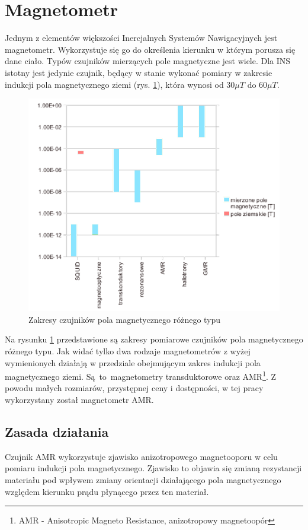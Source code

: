 \section{Magnetometr}
\label{sec:mag}

Jednym z elementów większości Inercjalnych Systemów Nawigacyjnych jest
magnetometr. Wykorzystuje się go do określenia kierunku w którym porusza się dane
ciało. Typów czujników mierzących pole magnetyczne jest wiele. Dla INS istotny
jest jedynie czujnik, będący w stanie wykonać pomiary w zakresie indukcji pola
magnetycznego ziemi (rys. \ref{fig:WykresMagnet}), która wynosi od $30\mu T$ do
$60\mu T$. 

\begin{figure}[!ht]
 \centering
 \includegraphics[width=\textwidth]{../images/ch04/magnetic_sens_types.png}
 \caption{Zakresy czujników pola magnetycznego różnego typu \cite{WstepnyProjektModuluIMU}}
 \label{fig:WykresMagnet}
\end{figure}

Na rysunku \ref{fig:WykresMagnet} przedstawione są zakresy pomiarowe czujników
pola magnetycznego różnego typu. Jak widać tylko dwa rodzaje magnetometrów z
wyżej wymienionych działają w przedziale obejmującym zakres indukcji pola
magnetycznego ziemi. Są~to~magnetometry transduktorowe oraz AMR\footnote{AMR -
Anisotropic Magneto Resistance, anizotropowy magnetoopór}. Z powodu małych
rozmiarów, przystępnej ceny i dostępności, w tej pracy wykorzystany został
magnetometr AMR.

\subsection{Zasada działania}
Czujnik AMR wykorzystuje zjawisko anizotropowego magnetooporu w celu pomiaru
indukcji pola magnetycznego. Zjawisko to objawia się zmianą rezystancji materiału
pod wpływem zmiany orientacji działającego pola magnetycznego względem kierunku
prądu płynącego przez ten materiał. 

